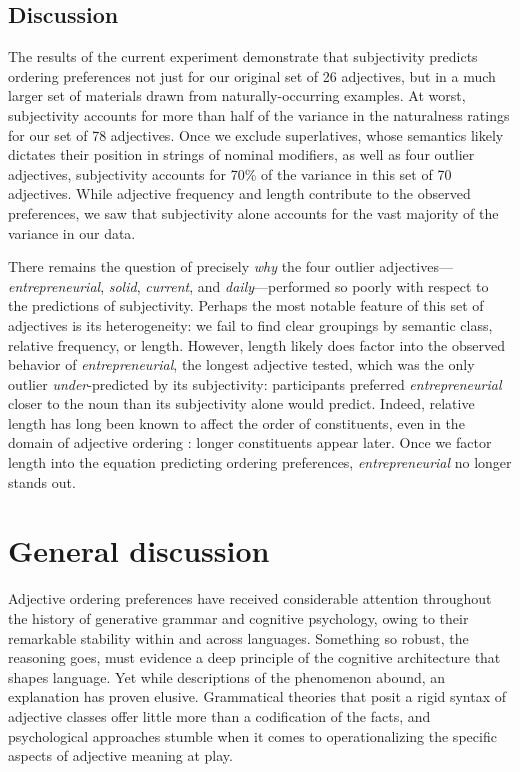 \documentclass[12pt]{article}
\begin{document}
\subsection{Discussion}

The results of the current experiment demonstrate that subjectivity predicts ordering preferences not just for our original set of 26 adjectives, but in a much larger set of materials drawn from naturally-occurring examples. At worst, subjectivity accounts for more than half of the variance in the naturalness ratings for our set of 78 adjectives. Once we exclude superlatives, whose semantics likely dictates their position in strings of nominal modifiers, as well as four outlier adjectives, subjectivity accounts for 70\% of the variance in this set of 70 adjectives. While adjective frequency and length contribute to the observed preferences, we saw that subjectivity alone accounts for the vast majority of the variance in our data.

There remains the question of precisely \emph{why} the four outlier adjectives---​\emph{entrepreneurial}​, ​\emph{solid}​, ​\emph{current}​, and ​\emph{daily}---performed so poorly with respect to the predictions of subjectivity. Perhaps the most notable feature of this set of adjectives is its heterogeneity: we fail to find clear groupings by semantic class, relative frequency, or length. However, length likely does factor into the observed behavior of \emph{entrepreneurial}, the longest adjective tested, which was the only outlier \emph{under}-predicted by its subjectivity: participants preferred \emph{entrepreneurial} closer to the noun than its subjectivity alone would predict. Indeed, relative length has long been known to affect the order of constituents, even in the domain of adjective ordering \citep{wulff2003}: longer constituents appear later. Once we factor length into the equation predicting ordering preferences, \emph{entrepreneurial} no longer stands out.


\section{General discussion}

Adjective ordering preferences have received considerable attention throughout the history of generative grammar and cognitive psychology, owing to their remarkable stability within and across languages. Something so robust, the reasoning goes, must evidence a deep principle of the cognitive architecture that shapes language. Yet while descriptions of the phenomenon abound, an explanation has proven elusive. Grammatical theories that posit a rigid syntax of adjective classes offer little more than a codification of the facts, and psychological approaches stumble when it comes to operationalizing the specific aspects of adjective meaning at play. 
\end{document}

